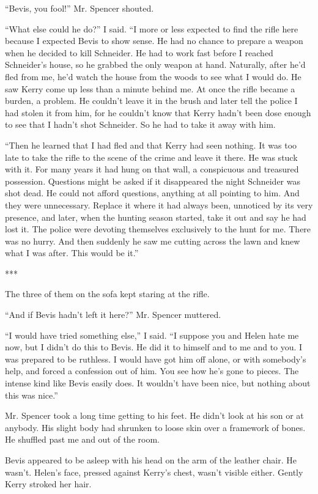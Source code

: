 {“Bevis, you fool!” Mr. Spencer shouted.

“What else could he do?” I said. “I more or less expected to find the rifle here because I expected Bevis to show sense. He had no chance to prepare a weapon when he decided to kill Schneider. He had to work fast before I reached Schneider’s house, so he grabbed the only weapon at hand. Naturally, after he’d fled from me, he’d watch the house from the woods to see what I would do. He saw Kerry come up less than a minute behind me. At once the rifle became a burden, a problem. He couldn’t leave it in the brush and later tell the police I had stolen it from him, for he couldn’t know that Kerry hadn’t been dose enough to see that I hadn’t shot Schneider. So he had to take it away with him.

“Then he learned that I had fled and that Kerry had seen nothing. It was too late to take the rifle to the scene of the crime and leave it there. He was stuck with it. For many years it had hung on that wall, a conspicuous and treasured possession. Questions might be asked if it disappeared the night Schneider was shot dead. He could not afford questions, anything at all pointing to him. And they were unnecessary. Replace it where it had always been, unnoticed by its very presence, and later, when the hunting season started, take it out and say he had lost it. The police were devoting themselves exclusively to the hunt for me. There was no hurry. And then suddenly he saw me cutting across the lawn and knew what I was after. This would be it.”

***

The three of them on the sofa kept staring at the rifle.

“And if Bevis hadn’t left it here?” Mr. Spencer muttered.

“I would have tried something else,” I said. “I suppose you and Helen hate me now, but I didn’t do this to Bevis. He did it to himself and to me and to you. I was prepared to be ruthless. I would have got him off alone, or with somebody’s help, and forced a confession out of him. You see how he’s gone to pieces. The intense kind like Bevis easily does. It wouldn’t have been nice, but nothing about this was nice.”

Mr. Spencer took a long time getting to his feet. He didn’t look at his son or at anybody. His slight body had shrunken to loose skin over a framework of bones. He shuffled past me and out of the room.

Bevis appeared to be asleep with his head on the arm of the leather chair. He wasn’t. Helen’s face, pressed against Kerry’s chest, wasn’t visible either. Gently Kerry stroked her hair.

}
